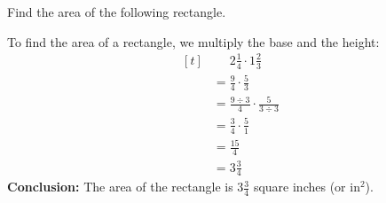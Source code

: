 \begin{myexample}
Find the area of the following rectangle.
\begin{center}
\end{center}
\end{myexample}
\begin{solution}
To find the area of a rectangle, we multiply the base and the height:
\[ 
\begin{aligned}[t]
	&\phantom{{}=} 2\frac{1}{4} \cdot 1\frac{2}{3} \\
	&= \frac{9}{4} \cdot \frac{5}{3} \\
	&= \frac{9\div3}{4} \cdot \frac{5}{3\div3} \\
	&= \frac{3}{4} \cdot \frac{5}{1} \\
	&= \frac{15}{4} \\
	&= 3\frac{3}{4}
\end{aligned}
\]
\textbf{Conclusion:} The area of the rectangle is $3\frac{3}{4}$ square inches (or $\text{in}^{2}$).
\end{solution}

